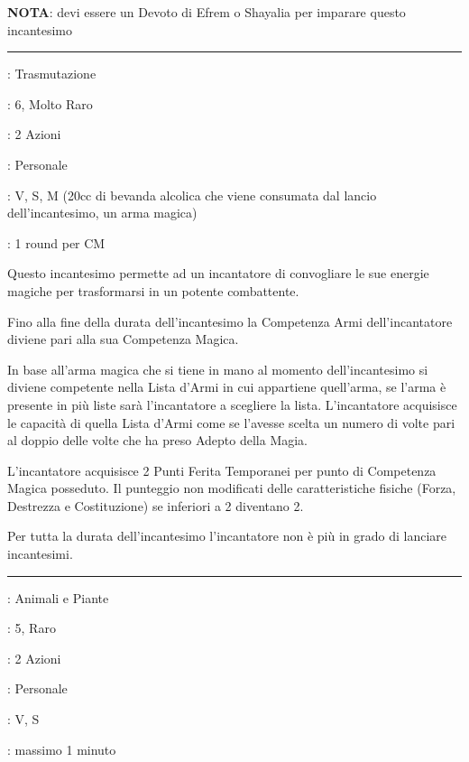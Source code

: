\begin{multicols}{2}
\textbf{NOTA}: devi essere un Devoto di Efrem o Shayalia per imparare questo incantesimo

\smallskip\noindent\rule{\linewidth}{2pt} \hypertarget{Trasformazione Furiosa di Restser}{}\smallskip{}
\noindent
\begin{description}[noitemsep, topsep=0pt, parsep=0pt, partopsep=0pt, leftmargin=0cm, labelwidth=2.8cm]
	\item[\textbf{Lista di Magia}]: Trasmutazione
	\item[\textbf{Livello}]: 6, Molto Raro
	\item[\textbf{T. di Lancio}]: 2 Azioni
	\item[\textbf{Gittata}]: Personale
	\item[\textbf{Componenti}]: V, S, M (20cc di bevanda alcolica che viene consumata dal lancio dell'incantesimo, un arma magica)
	\item[\textbf{Durata}]: 1 round per CM
\end{description}

Questo incantesimo permette ad un incantatore di convogliare le sue energie magiche per trasformarsi in un potente combattente.

Fino alla fine della durata dell'incantesimo la Competenza Armi dell'incantatore diviene pari alla sua Competenza Magica.

In base all'arma magica che si tiene in mano al momento dell'incantesimo si diviene competente nella Lista d'Armi in cui appartiene quell'arma, se l'arma è presente in più liste sarà l'incantatore a scegliere la lista. L'incantatore acquisisce le capacità di quella Lista d'Armi come se l'avesse scelta un numero di volte pari al doppio delle volte che ha preso Adepto della Magia.

L'incantatore acquisisce 2 Punti Ferita Temporanei per punto di Competenza Magica posseduto.
Il punteggio non modificati delle caratteristiche fisiche (Forza, Destrezza e Costituzione) se inferiori a 2 diventano 2.

Per tutta la durata dell'incantesimo l'incantatore non è più in grado di lanciare incantesimi.

\smallskip\noindent\rule{\linewidth}{2pt} \hypertarget{Traslazione Arborea}{}\smallskip{}
\noindent
\begin{description}[noitemsep, topsep=0pt, parsep=0pt, partopsep=0pt, leftmargin=0cm, labelwidth=2.8cm]
	\item[\textbf{Lista di Magia}]: Animali e Piante
	\item[\textbf{Livello}]: 5, Raro
	\item[\textbf{T. di Lancio}]: 2 Azioni
	\item[\textbf{Gittata}]: Personale
	\item[\textbf{Componenti}]: V, S
	\item[\textbf{Durata}]: massimo 1 minuto
\end{description}


\end{multicols}
